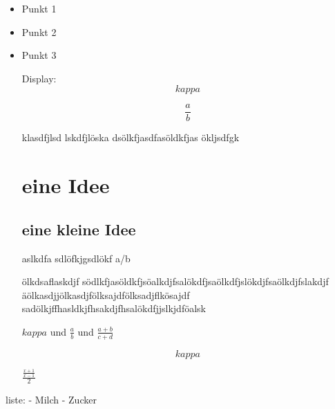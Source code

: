 \documentclass{protokoll}
\begin{document}
\begin{itemize}

\item Punkt 1
\item Punkt 2
\item Punkt 3

Display:
\begin{equation}
kappa
\end{equation}


\begin{equation}
\frac{a}{b}
\end{equation}



klasdfjlsd
lskdfjlöska
dsölkfjasdfasöldkfjas
ökljsdfgk

\section{eine Idee }
\subsection{eine kleine Idee}
aslkdfa
sdlöfkjgsdlökf
a/b

ölkdsaflaskdjf
södlkfjasöldkfjsöalkdjfsalökdfjsaölkdfjslökdjfsaölkdjfslakdjf
äölkasdjjölkasdjfölksajdfölksadjflkösajdf
sadölkjffhasldkjfhsakdjfhsalökdfjjslkjdföalsk

$kappa$ und $\frac{a}{b}$ und $\frac{a + b}{c + d}$

\begin{equation}
kappa
\end{equation}


$\frac{\frac{x+1}{x-1}}{2}$

\end{itemize}


liste:
- Milch
- Zucker
\end{document}

